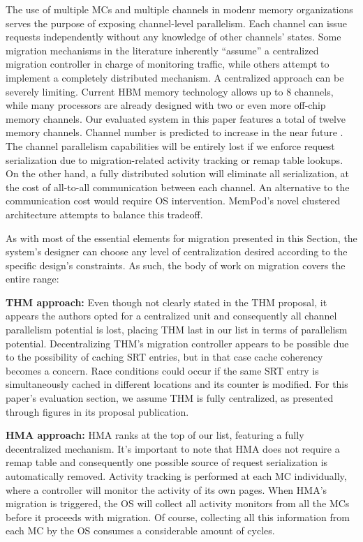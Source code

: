 The use of multiple MCs and multiple channels in modenr memory organizations serves the purpose of exposing channel-level parallelism. Each channel can issue requests independently without any knowledge of other channels' states. Some migration mechanisms in the literature inherently ``assume'' a centralized migration controller in charge of monitoring traffic, while others attempt to implement a completely distributed mechanism. A centralized approach can be severely limiting. Current HBM memory technology allows up to 8 channels, while many processors are already designed with two or even more off-chip memory channels. Our evaluated system in this paper features a total of twelve memory channels. Channel number is predicted to increase in the near future \TODO{[cite]}. The channel parallelism capabilities will be entirely lost if we enforce request serialization due to migration-related activity tracking or remap table lookups. On the other hand, a fully distributed solution will eliminate all serialization, at the cost of all-to-all communication between each channel. An alternative to the communication cost would require OS intervention. MemPod's novel clustered architecture attempts to balance this tradeoff. 

As with most of the essential elements for migration presented in this Section, the system's designer can choose any level of centralization desired according to the specific design's constraints. As such, the body of work on migration covers the entire range:

	\textbf{THM approach:} Even though not clearly stated in the THM proposal, it appears the authors opted for a centralized unit and consequently all channel parallelism potential is lost, placing THM last in our list in terms of parallelism potential. Decentralizing THM's migration controller appears to be possible due to the possibility of caching SRT entries, but in that case cache coherency becomes a concern. Race conditions could occur if the same SRT entry is simultaneously cached in different locations and its counter is modified. For this paper's evaluation section, we assume THM is fully centralized, as presented through figures in its proposal publication.

	\textbf{HMA approach:} HMA ranks at the top of our list, featuring a fully decentralized mechanism. It's important to note that HMA does not require a remap table and consequently one possible source of request serialization is automatically removed. Activity tracking is performed at each MC individually, where a controller will monitor the activity of its own pages. When HMA's migration is triggered, the OS will collect all activity monitors from all the MCs before it proceeds with migration. Of course, collecting all this information from each MC by the OS consumes a considerable amount of cycles.


